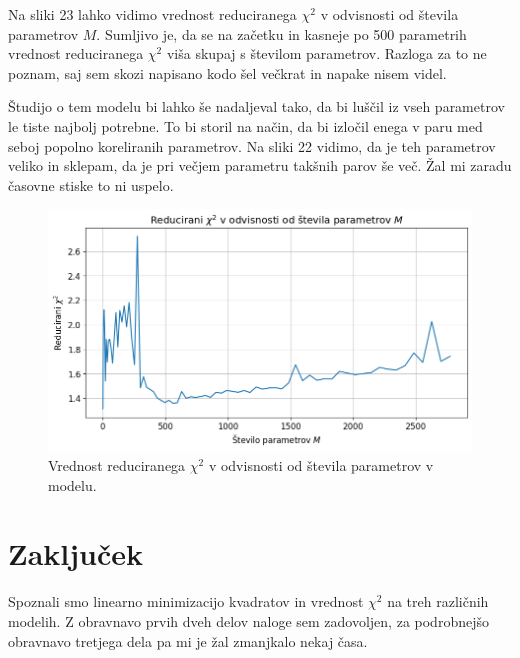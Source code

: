 \documentclass[slovene,11pt,a4paper]{article}
\begin{document}
Na sliki 23 lahko vidimo vrednost reduciranega $\chi^2$ v odvisnosti od števila parametrov $M$. Sumljivo je, da se na začetku in kasneje po 500 parametrih vrednost reduciranega $\chi^2$ viša skupaj s številom parametrov. Razloga za to ne poznam, saj sem skozi napisano kodo šel večkrat in napake nisem videl.

Študijo o tem modelu bi lahko še nadaljeval tako, da bi luščil iz vseh parametrov le tiste najbolj potrebne. To bi storil na način, da bi izločil enega v paru med seboj popolno koreliranih parametrov. Na sliki 22 vidimo, da je teh parametrov veliko in sklepam, da je pri večjem parametru takšnih parov še več. Žal mi zaradu časovne stiske to ni uspelo.

\begin{figure}[h!]
\centering
\includegraphics[width=13cm]{spektro4.png}
\caption{Vrednost reduciranega $\chi^2$ v odvisnosti od števila parametrov v modelu.}
\end{figure}

\section{Zaključek}

Spoznali smo linearno minimizacijo kvadratov in vrednost $\chi^2$ na treh različnih modelih. Z obravnavo prvih dveh delov naloge sem zadovoljen, za podrobnejšo obravnavo tretjega dela pa mi je žal zmanjkalo nekaj časa.
\end{document}
